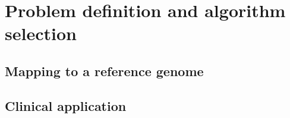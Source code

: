 \section{Problem definition and algorithm selection}

\subsection{Mapping to a reference genome}

\subsection{Clinical application}